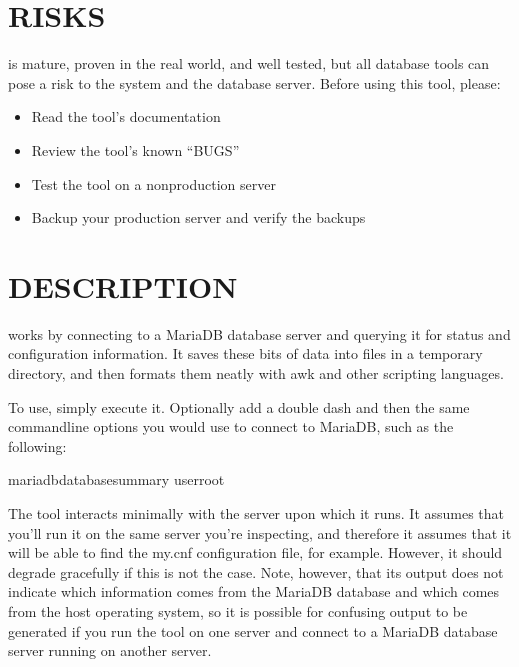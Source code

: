 \documentclass[letterpaper,10pt,english]{sphinxmanual}
\begin{document}
\section{RISKS}
\label{\detokenize{mariadb-database-summary:risks}}
\sphinxAtStartPar
{} is mature, proven in the real world, and well tested,
but all database tools can pose a risk to the system and the database
server.  Before using this tool, please:
\begin{itemize}
\item {} 
\sphinxAtStartPar
Read the tool’s documentation

\item {} 
\sphinxAtStartPar
Review the tool’s known “BUGS”

\item {} 
\sphinxAtStartPar
Test the tool on a non\sphinxhyphen{}production server

\item {} 
\sphinxAtStartPar
Backup your production server and verify the backups

\end{itemize}


\section{DESCRIPTION}
\label{\detokenize{mariadb-database-summary:description}}
\sphinxAtStartPar
{} works by connecting to a MariaDB database server and querying
it for status and configuration information.  It saves these bits of data
into files in a temporary directory, and then formats them neatly with awk
and other scripting languages.

\sphinxAtStartPar
To use, simply execute it.  Optionally add a double dash and then the same
command\sphinxhyphen{}line options you would use to connect to MariaDB, such as the following:

\begin{sphinxVerbatim}[commandchars=\\\{\}]
mariadb\PYGZhy{}database\PYGZhy{}summary \PYGZhy{}\PYGZhy{}userroot
\end{sphinxVerbatim}

\sphinxAtStartPar
The tool interacts minimally with the server upon which it runs.  It assumes
that you’ll run it on the same server you’re inspecting, and therefore it
assumes that it will be able to find the my.cnf configuration file, for example.
However, it should degrade gracefully if this is not the case.  Note, however,
that its output does not indicate which information comes from the MariaDB
database and which comes from the host operating system, so it is possible for
confusing output to be generated if you run the tool on one server and connect
to a MariaDB database server running on another server.
\end{document}
